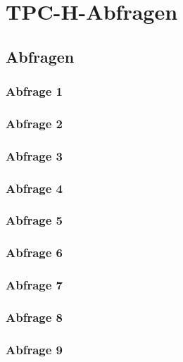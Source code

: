 \chapter{TPC-H-Abfragen}
\section{Abfragen}
\subsection{Abfrage 1}

\subsection{Abfrage 2}

\newpage
\subsection{Abfrage 3}

\subsection{Abfrage 4}

\subsection{Abfrage 5}

\subsection{Abfrage 6}

\subsection{Abfrage 7}

\subsection{Abfrage 8}

\subsection{Abfrage 9}

